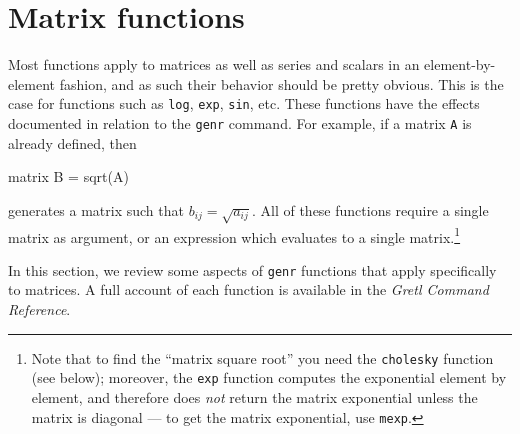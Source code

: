 \section{Matrix functions}
\label{sec:matrix-func}

Most  functions apply to matrices as well as series and
scalars in an element-by-element fashion, and as such their behavior
should be pretty obvious. This is the case for functions such as
\texttt{log}, \texttt{exp}, \texttt{sin}, etc.  These functions
have the effects documented in relation to the \texttt{genr} command.
For example, if a matrix \texttt{A} is already defined, then
%
\begin{code}
matrix B = sqrt(A)
\end{code}
%
generates a matrix such that $b_{ij} = \sqrt{a_{ij}}$.  All of these
functions require a single matrix as argument, or an expression which
evaluates to a single matrix.\footnote{Note that to find the ``matrix
  square root'' you need the \texttt{cholesky} function (see below);
  moreover, the \texttt{exp} function computes the exponential element
  by element, and therefore does \emph{not} return the matrix
  exponential unless the matrix is diagonal --- to get the matrix
  exponential, use \texttt{mexp}.}

In this section, we review some aspects of \texttt{genr} functions that
apply specifically to matrices. A full account of each function is
available in the \emph{Gretl Command Reference}.

\newlength{\cwid}
\setlength{\cwid}{0.1\textwidth}

